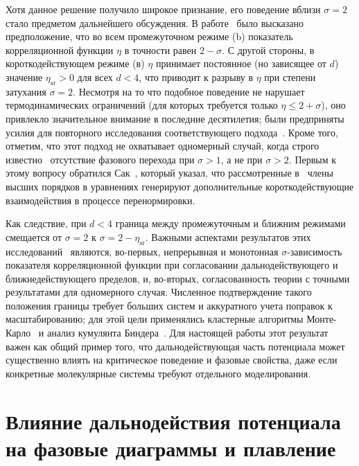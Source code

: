 Хотя данное решение получило широкое признание, его поведение вблизи $\sigma=2$ стало предметом дальнейшего обсуждения.
В работе~\cite{10.1103/PhysRevLett.29.917} было высказано предположение, что во всем промежуточном режиме (b) показатель корреляционной функции $\eta$ в точности равен $2-\sigma$.
С другой стороны, в короткодействующем режиме (в) $\eta$ принимает постоянное (но зависящее от $d$) значение $\eta_{\mathrm{sr}}>0$ для всех $d<4$, что приводит к разрыву в $\eta$ при степени затухания $\sigma=2$.
Несмотря на то что подобное поведение не нарушает термодинамических ограничений (для которых требуется только $\eta\leq 2+\sigma$), оно привлекло значительное внимание в последние десятилетия; были предприняты усилия для повторного исследования соответствующего подхода~\cite{10.1103/PhysRevB.8.281, 10.1088/0305-4470/22/6/024}.
Кроме того, отметим, что этот подход не охватывает одномерный случай, когда строго известно~\cite{10.1007/BF01654281} отсутствие фазового перехода при $\sigma>1$, а не при $\sigma>2$.
Первым к этому вопросу обратился Сак~\cite{10.1103/PhysRevB.8.281}, который указал, что рассмотренные в~\cite{10.1103/PhysRevLett.29.917} члены высших порядков в уравнениях генерируют дополнительные короткодействующие взаимодействия в процессе перенормировки.

Как следствие, при $d<4$ граница между промежуточным и ближним режимами смещается от $\sigma=2$ к $\sigma=2-\eta_{\mathrm{sr}}$.
Важными аспектами результатов этих исследований~\cite{10.1088/0305-4470/22/6/024} являются, во-первых, непрерывная и монотонная $\sigma$-зависимость показателя корреляционной функции при согласовании дальнодействующего и ближнедействующего пределов, и, во-вторых, согласованность теории с точными результатами для одномерного случая.
Численное подтверждение такого положения границы требует больших систем и аккуратного учета поправок к масштабированию; для этой цели применялись кластерные алгоритмы Монте-Карло~\cite{10.1142/S0129183195000265} и анализ кумулянта Биндера~\cite{10.1007/BF01293604, 10.1103/physrevlett.89.025703}.
Для настоящей работы этот результат важен как общий пример того, что дальнодействующая часть потенциала может существенно влиять на критическое поведение и фазовые свойства, даже если конкретные молекулярные системы требуют отдельного моделирования.


\section{Влияние дальнодействия потенциала на фазовые диаграммы и плавление}

